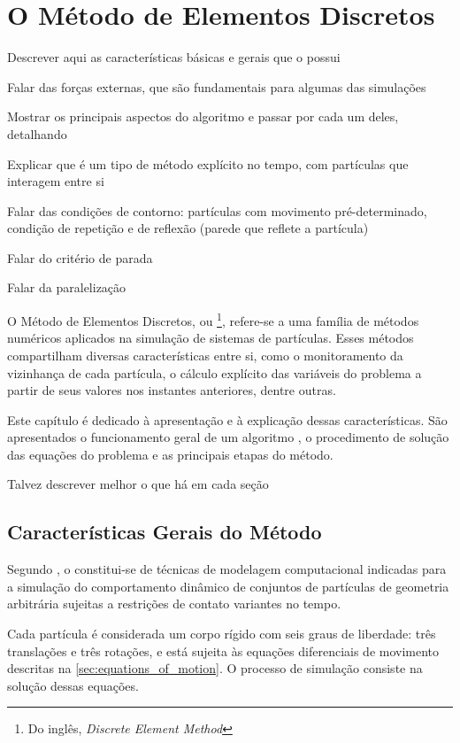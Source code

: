 \chapter{O Método de Elementos Discretos} \label{ch:discrete_element_method}

\alert{Descrever aqui as características básicas e gerais que o \DEM{} possui}

\alert{Falar das forças externas, que são fundamentais para algumas das simulações}

\alert{Mostrar os principais aspectos do algoritmo e passar por cada um deles, detalhando}

\alert{Explicar que é um tipo de método explícito no tempo, com partículas que interagem entre si}

\alert{Falar das condições de contorno: partículas com movimento pré-determinado, condição de repetição e de reflexão (parede que reflete a partícula)}

\alert{Falar do critério de parada}

\alert{Falar da paralelização}

O Método de Elementos Discretos, ou \DEM{}\footnote{Do inglês, \textit{Discrete Element Method}}, refere-se a uma família de métodos numéricos aplicados na simulação de sistemas de partículas. Esses métodos compartilham diversas características entre si, como o monitoramento da vizinhança de cada partícula, o cálculo explícito das variáveis do problema a partir de seus valores nos instantes anteriores, dentre outras.

Este capítulo é dedicado à apresentação e à explicação dessas características. São apresentados o funcionamento geral de um algoritmo \DEM{}, o procedimento de solução das equações do problema e as principais etapas do método.

\alert{Talvez descrever melhor o que há em cada seção}

\section{Características Gerais do Método}

Segundo , o \DEM{} constitui-se de técnicas de modelagem computacional indicadas para a simulação do comportamento dinâmico de conjuntos de partículas de geometria arbitrária sujeitas a restrições de contato variantes no tempo.

Cada partícula é considerada um corpo rígido com seis graus de liberdade: três translações e três rotações, e está sujeita às equações diferenciais de movimento descritas na \autoref{sec:equations_of_motion}. O processo de simulação consiste na solução dessas equações.

